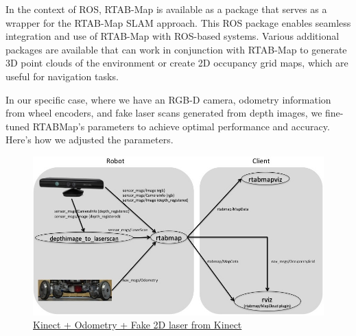 In the context of ROS, RTAB-Map is available as a package that serves as a wrapper for the RTAB-Map SLAM approach. This ROS package enables seamless integration and use of RTAB-Map with ROS-based systems. Various additional packages are available that can work in conjunction with RTAB-Map to generate 3D point clouds of the environment or create 2D occupancy grid maps, which are useful for navigation tasks.

In our specific case, where we have an RGB-D camera, odometry information from wheel encoders, and fake laser scans generated from depth images, we fine-tuned RTABMap's parameters to achieve optimal performance and accuracy. Here's how we adjusted the parameters.

\begin{figure}[H]
	\centering
	\includegraphics[width=0.8\linewidth]{figures/rtabmap-config.png}
	\caption{\href{http://wiki.ros.org/rtabmap_ros/Tutorials/SetupOnYourRobot}{Kinect + Odometry + Fake 2D laser from Kinect}}
	\label{fig:rtabmap-config}
\end{figure}


